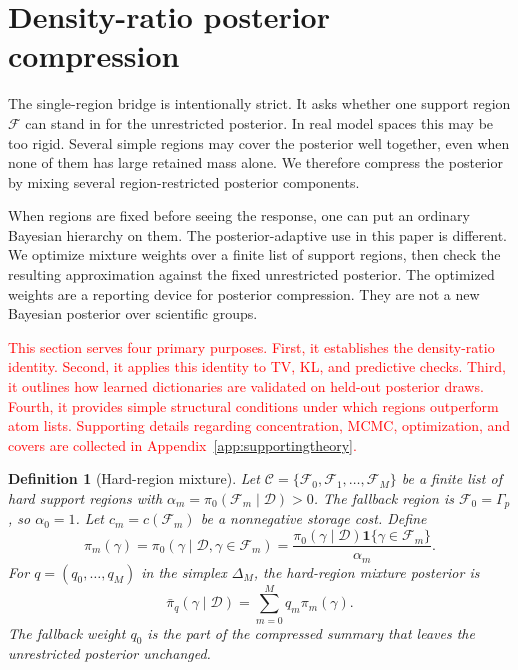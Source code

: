 \documentclass[twoside,11pt]{article}
\newtheorem{definition}{Definition}
\newcommand{\D}{\mathcal{D}}
\newcommand{\F}{\mathcal{F}}
\newcommand{\ind}{\mathbf{1}}
\newcommand{\rev}[1]{\textcolor{red}{#1}}
\begin{document}
\section{Density-ratio posterior compression}
\label{sec:mixture}

The single-region bridge is intentionally strict. It asks whether one support region \(\F\) can stand in for the unrestricted posterior. In real model spaces this may be too rigid. Several simple regions may cover the posterior well together, even when none of them has large retained mass alone. We therefore compress the posterior by mixing several region-restricted posterior components.

When regions are fixed before seeing the response, one can put an ordinary Bayesian hierarchy on them. The posterior-adaptive use in this paper is different. We optimize mixture weights over a finite list of support regions, then check the resulting approximation against the fixed unrestricted posterior. The optimized weights are a reporting device for posterior compression. They are not a new Bayesian posterior over scientific groups.

\rev{This section serves four primary purposes. First, it establishes the density-ratio identity. Second, it applies this identity to TV, KL, and predictive checks. Third, it outlines how learned dictionaries are validated on held-out posterior draws. Fourth, it provides simple structural conditions under which regions outperform atom lists. Supporting details regarding concentration, MCMC, optimization, and covers are collected in Appendix~\ref{app:supportingtheory}.}

\begin{definition}[Hard-region mixture]
\label{def:familydictionary}
Let $\mathcal C=\{\F_0,\F_1,\dots,\F_M\}$ be a finite list of hard support regions with $\alpha_m=\pi_0(\F_m\mid\D)>0$. The fallback region is $\F_0=\Gamma_p$, so $\alpha_0=1$. Let $c_m=c(\F_m)$ be a nonnegative storage cost. Define
\[
\pi_m(\gamma) = \pi_0(\gamma\mid\D,\gamma\in\F_m) = \frac{\pi_0(\gamma\mid\D)\ind\{\gamma\in\F_m\}}{\alpha_m}.
\]
For $q=(q_0,\dots,q_M)$ in the simplex $\Delta_M$, the hard-region mixture posterior is
\begin{equation}
\bar\pi_q(\gamma\mid\D) = \sum_{m=0}^M q_m \pi_m(\gamma). \label{eq:qmixture}
\end{equation}
The fallback weight \(q_0\) is the part of the compressed summary that leaves the unrestricted posterior unchanged.
\end{definition}
\end{document}
